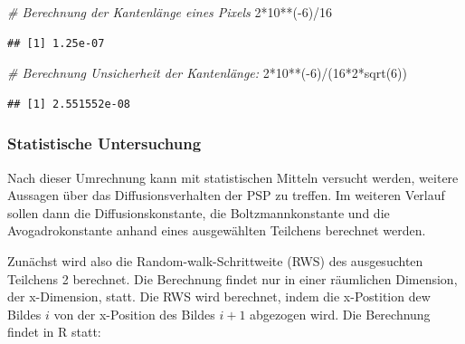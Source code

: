 \documentclass[
  9pt,
]{article}
\newenvironment{Shaded}{\begin{snugshade}}{\end{snugshade}}
\newcommand{\CommentTok}[1]{\textcolor[rgb]{0.56,0.35,0.01}{\textit{#1}}}
\newcommand{\DecValTok}[1]{\textcolor[rgb]{0.00,0.00,0.81}{#1}}
\newcommand{\FunctionTok}[1]{\textcolor[rgb]{0.00,0.00,0.00}{#1}}
\newcommand{\NormalTok}[1]{#1}
\newcommand{\SpecialCharTok}[1]{\textcolor[rgb]{0.00,0.00,0.00}{#1}}
\begin{document}
\begin{Shaded}
\begin{Highlighting}[]
\CommentTok{\# Berechnung der Kantenlänge eines Pixels}
\DecValTok{2}\SpecialCharTok{*}\DecValTok{10}\SpecialCharTok{**}\NormalTok{(}\SpecialCharTok{{-}}\DecValTok{6}\NormalTok{)}\SpecialCharTok{/}\DecValTok{16}
\end{Highlighting}
\end{Shaded}

\begin{verbatim}
## [1] 1.25e-07
\end{verbatim}

\begin{Shaded}
\begin{Highlighting}[]
\CommentTok{\# Berechnung Unsicherheit der Kantenlänge:}
\DecValTok{2}\SpecialCharTok{*}\DecValTok{10}\SpecialCharTok{**}\NormalTok{(}\SpecialCharTok{{-}}\DecValTok{6}\NormalTok{)}\SpecialCharTok{/}\NormalTok{(}\DecValTok{16}\SpecialCharTok{*}\DecValTok{2}\SpecialCharTok{*}\FunctionTok{sqrt}\NormalTok{(}\DecValTok{6}\NormalTok{))}
\end{Highlighting}
\end{Shaded}

\begin{verbatim}
## [1] 2.551552e-08
\end{verbatim}

\hypertarget{statistische-untersuchung}{%
\subsubsection{Statistische
Untersuchung}\label{statistische-untersuchung}}

Nach dieser Umrechnung kann mit statistischen Mitteln versucht werden,
weitere Aussagen über das Diffusionsverhalten der PSP zu treffen. Im
weiteren Verlauf sollen dann die Diffusionskonstante, die
Boltzmannkonstante und die Avogadrokonstante anhand eines ausgewählten
Teilchens berechnet werden.

Zunächst wird also die Random-walk-Schrittweite (RWS) des ausgesuchten
Teilchens 2 berechnet. Die Berechnung findet nur in einer räumlichen
Dimension, der x-Dimension, statt. Die RWS wird berechnet, indem die
x-Postition dew Bildes \(i\) von der x-Position des Bildes \(i+1\)
abgezogen wird. Die Berechnung findet in R statt:
\end{document}
